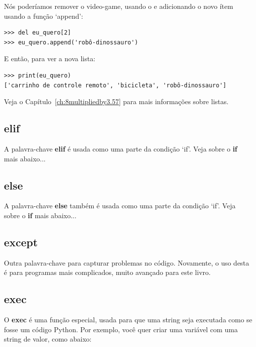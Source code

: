 \noindent
Nós poderíamos remover o video-game, usando o  e adicionando o novo ítem usando a função `append':

\begin{listing}
\begin{verbatim}
>>> del eu_quero[2]
>>> eu_quero.append('robô-dinossauro')
\end{verbatim}
\end{listing}

\noindent
E então, para ver a nova lista:

\begin{listing}
\begin{verbatim}
>>> print(eu_quero)
['carrinho de controle remoto', 'bicicleta', 'robô-dinossauro']
\end{verbatim}
\end{listing}

\noindent
Veja o Capítulo~\ref{ch:8multipliedby3.57} para mais informações sobre listas.

\subsection*{elif}

A palavra-chave \textbf{elif} é usada como uma parte da condição `if'. Veja sobre o \textbf{if} mais abaixo...

\subsection*{else}

A palavra-chave \textbf{else} também é usada como uma parte da condição `if'. Veja sobre o \textbf{if} mais abaixo...

\subsection*{except}

Outra palavra-chave para capturar problemas no código. Novamente, o uso desta é para programas mais complicados, muito avançado para este livro.

\subsection*{exec}

O \textbf{exec} é uma função especial, usada para que uma string seja executada como se fosse um código Python. Por exemplo, você quer criar uma variável com uma string de valor, como abaixo:

